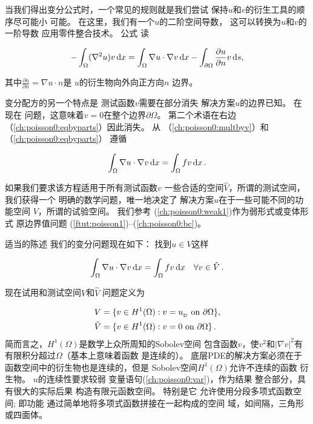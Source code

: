 当我们得出变分公式时，一个常见的规则就是我们尝试
保持$u$和$v$的衍生工具的顺序尽可能小
可能。 在这里，我们有一个$u$的二阶空间导数，
这可以转换为$u$和$v$的一阶导数
应用零件整合技术。 公式
读

\begin{equation}
\label{ch:poisson0:eqbyparts}
 -\int_\Omega (\nabla^2 u)v \dx
= \int_\Omega\nabla u\cdot\nabla v \dx - \int_{\partial\Omega}{\partial u\over
\partial n}v \ds,
\end{equation}

其中$\frac{\partial u}{\partial n} = \nabla u \cdot n$是
$u$的衍生物向外向正方向$n$
边界。

变分配方的另一个特点是
测试函数$v$需要在部分消失
解决方案$u$的边界已知。
在现在
问题，这意味着$v = 0$在整个边界$\partial \Omega$。
第二个术语在右边
（\ref{ch:poisson0:eqbyparts}）因此消失。 从
（\ref{ch:poisson0:multbyv}）和（\ref{ch:poisson0:eqbyparts}）
遵循

\begin{equation}
\int_\Omega\nabla u\cdot\nabla v \dx = \int_\Omega fv \dx\tp
\label{ch:poisson0:weak1}
\end{equation}

如果我们要求该方程适用于所有测试函数$v$
一些合适的空间$\hat V$，所谓的测试空间，我们获得一个
明确的数学问题，唯一地决定了
解决方案$u$在于一些可能不同的功能空间
$V$，所谓的试验空间。 我们参考
(\ref{ch:poisson0:weak1})作为弱形式或变体形式
原边界值问题
(\ref{ftut:poisson1})--(\ref{ch:poisson0:bc})。

适当的陈述
我们的变分问题现在如下：
找到$u \in V$这样

\begin{equation} \label{ch:poisson0:var}
  \int_{\Omega} \nabla u \cdot \nabla v \dx =
  \int_{\Omega} fv \dx
  \quad \forall v \in \hat{V}\tp
\end{equation}

现在试用和测试空间$V$和$\hat V$
问题定义为

\begin{align*}
     V      &= \{v \in H^1(\Omega) : v = \ub \mbox{ on } \partial\Omega\}, \\
    \hat{V} &= \{v \in H^1(\Omega) : v = 0 \mbox{ on } \partial\Omega\}\tp
\end{align*}
简而言之，$H^1(\Omega)$是数学上众所周知的Sobolev空间
包含函数$v$，使$v^2$和$|\nabla v|^2$有
有限积分超过$\Omega$（基本上意味着函数
是连续的）。 底层PDE的解决方案必须在于
函数空间中的衍生物也是连续的，但是
Sobolev空间$H^1(\Omega)$允许不连续的函数
衍生物。 $u$的连续性要求较弱
变量语句(\ref{ch:poisson0:var})，作为结果
整合部分，具有很大的实际后果
构造有限元函数空间。 特别是它
允许使用分段多项式函数空间; 即功能
通过简单地将多项式函数拼接在一起构成的空间
域，如间隔，三角形或四面体。

